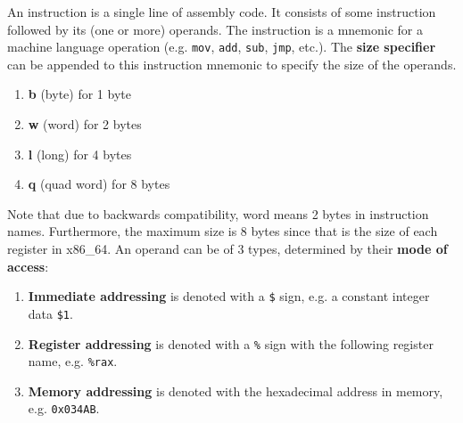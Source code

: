       \begin{definition}[Instruction]
        An instruction is a single line of assembly code. It consists of some instruction followed by its (one or more) operands. The instruction is a mnemonic for a machine language operation (e.g. \texttt{mov}, \texttt{add}, \texttt{sub}, \texttt{jmp}, etc.). The \textbf{size specifier} can be appended to this instruction mnemonic to specify the size of the operands. 
        \begin{enumerate} 
          \item \textbf{b} (byte) for 1 byte 
          \item \textbf{w} (word) for 2 bytes
          \item \textbf{l} (long) for 4 bytes 
          \item \textbf{q} (quad word) for 8 bytes
        \end{enumerate}
        Note that due to backwards compatibility, word means 2 bytes in instruction names. Furthermore, the maximum size is 8 bytes since that is the size of each register in x86\_64. An operand can be of 3 types, determined by their \textbf{mode of access}:
        \begin{enumerate} 
          \item \textbf{Immediate addressing} is denoted with a \texttt{\$} sign, e.g. a constant integer data \texttt{\$1}. 
          \item \textbf{Register addressing} is denoted with a \texttt{\%} sign with the following register name, e.g. \texttt{\%rax}.
          \item \textbf{Memory addressing} is denoted with the hexadecimal address in memory, e.g. \texttt{0x034AB}.
        \end{enumerate}
      \end{definition}

